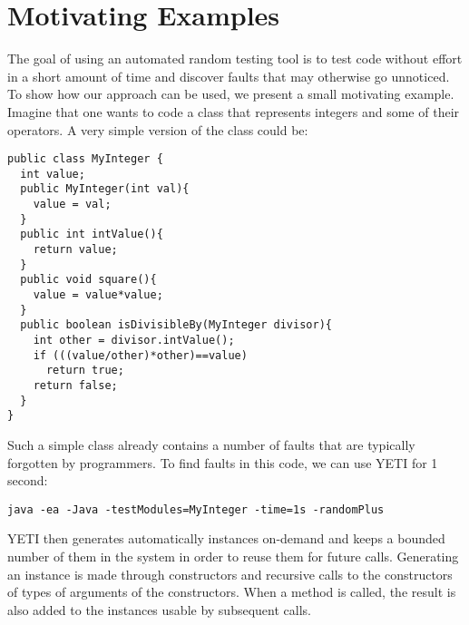 \section{Motivating Examples}\label{sec:example}

The goal of using an automated random testing tool is to test code without effort in a 
short amount of time and discover faults that may otherwise go unnoticed.
To show how our approach can be used, we present a small motivating example.
Imagine that one wants to code a class that represents integers and some of their operators.
A very simple version of the class could be:

{\small
\begin{verbatim}
public class MyInteger {
  int value;
  public MyInteger(int val){
    value = val;
  }
  public int intValue(){
    return value;
  }
  public void square(){
    value = value*value;
  }
  public boolean isDivisibleBy(MyInteger divisor){
    int other = divisor.intValue();
    if (((value/other)*other)==value)
      return true;
    return false;
  }
}
\end{verbatim}
}

Such a simple class already contains a number of faults that are typically forgotten by programmers.
To find faults in this code, we can use YETI for 1 second:
{\small
\begin{verbatim}
java -ea -Java -testModules=MyInteger -time=1s -randomPlus
\end{verbatim}
}

YETI then generates automatically instances on-demand and keeps a bounded number of them in the system in order to reuse them for future calls. 
Generating an instance is made through constructors and recursive calls to the constructors of types of arguments of the constructors. 
When a method is called, the result is also added to the instances usable by subsequent calls.

